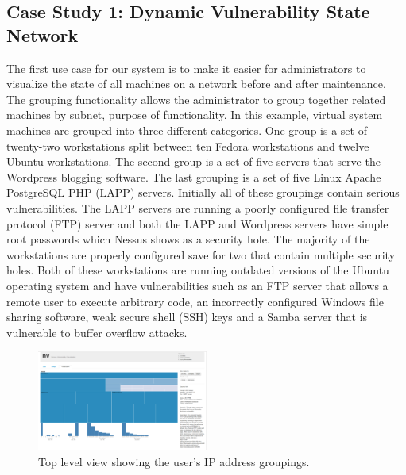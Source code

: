\documentclass{acm_proc_article-sp}
\begin{document}
\subsection{Case Study 1: Dynamic Vulnerability State Network }
The first use case for our system is to make it easier for administrators to
visualize the state of all machines on a network before and after maintenance. 
The grouping functionality allows
the administrator to group together related machines by subnet, purpose of
functionality. In this example, virtual system machines are grouped into three
different categories. One group is a set of twenty-two workstations split
between ten Fedora workstations and twelve Ubuntu workstations. The second group is
a set of five servers that serve the Wordpress blogging software.  The last
grouping is a set of five Linux Apache PostgreSQL PHP (LAPP) servers.
Initially all of these groupings contain serious vulnerabilities.
The LAPP servers are running a poorly configured file transfer protocol (FTP) server
and both the LAPP and Wordpress servers have simple root passwords
which Nessus shows as a security hole. The majority of the workstations are properly configured
save for two that contain multiple security holes. Both of these workstations are
running outdated versions of the Ubuntu operating system and have
vulnerabilities such as an FTP server that allows a remote user to execute
arbitrary code, an incorrectly configured Windows file sharing software, weak secure shell
(SSH) keys and a Samba server that is vulnerable to buffer overflow attacks.

\begin{figure}
  \label{SimOverviewFig}
  \centering
  \includegraphics[width=0.5\textwidth]{../screenshots/final/SimGroupSingle}
  \caption{Top level view showing the user's IP address groupings.}
\end{figure}
\end{document}
